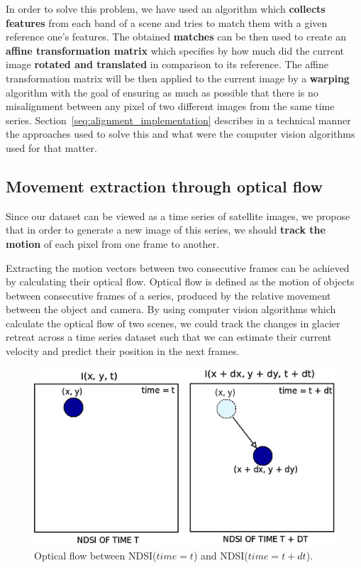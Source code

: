 \documentclass[12pt, a4paper]{report}
\begin{document}
	\par In order to solve this problem, we have used an algorithm which \textbf{collects features} from each band of a scene and tries to match them with a given reference one's features. The obtained \textbf{matches} can be then used to create an \textbf{affine transformation matrix} which specifies by how much did the current image \textbf{rotated and translated} in comparison to its reference. The affine transformation matrix will be then applied to the current image by a \textbf{warping} algorithm with the goal of ensuring as much as possible that there is no misalignment between any pixel of two different images from the same time series. Section~\ref{seq:alignment_implementation} describes in a technical manner the approaches used to solve this and what were the computer vision algorithms used for that matter. 

	\subsection{Movement extraction through optical flow}
	\label{seq:ndsi_motion_matrix}
	
	\par Since our dataset can be viewed as a time series of satellite images, we propose that in order to generate a new image of this series, we should \textbf{track the motion} of each pixel from one frame to another.
	
	\par Extracting the motion vectors between two consecutive frames can be achieved by
	calculating their optical flow. Optical flow is defined as the motion of objects between
	consecutive frames of a series, produced by the relative movement between the object
	and camera. By using computer vision algorithms which calculate the optical flow of two
	scenes, we could track the changes in glacier retreat across a time series dataset such that we can estimate
	their current velocity and predict their position in the next frames.
	
	\begin{figure}[h]
		\centering
		\includegraphics[scale=0.3]{../images/optical_flow_schema.png}
		\caption{Optical flow between NDSI(\(time=t\)) and NDSI(\(time=t+dt\)).}
		\label{fig:optical_flow_schema}
	\end{figure}
	
\end{document}
